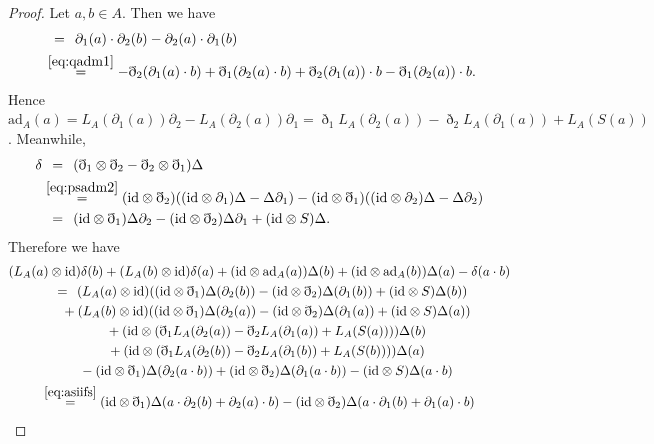 \documentclass[10pt,a4paper]{amsart}
\numberwithin{equation}{section}
\newcommand{\ad}{\mathrm{ad}}
\newcommand{\id}{\mathrm{id}}
\begin{document}
\begin{proof} Let $a, b \in A$. Then we have
 \begin{align*}
 [a,b] &\overset{\hphantom{(2.7)}}{=} \partial_1(a) \cdot \partial_2(b) - \partial_2(a) \cdot \partial_1(b) \\
 & \overset{\eqref{eq:qadm1}}{=} -\eth_2(\partial_1(a) \cdot b) + \eth_1(\partial_2(a) \cdot b) + \eth_2(\partial_1(a)) \cdot b - \eth_1(\partial_2(a)) \cdot b.
 \end{align*}
 Hence $\ad_A(a) = L_A(\partial_1(a))\partial_2 - L_A(\partial_2(a))\partial_1 = \eth_1 L_A(\partial_2(a)) - \eth_2 L_A(\partial_1(a)) + L_A(S(a))$. Meanwhile,
 \begin{align*}
 \delta &\overset{\hphantom{(3.6)}}{=} (\eth_1 \otimes \eth_2 - \eth_2 \otimes \eth_1)\Delta \\
 &\overset{\eqref{eq:psadm2}}{=}(\id \otimes \eth_2)( (\id \otimes \partial_1 )\Delta - \Delta \partial_1) - (\id \otimes \eth_1)( (\id \otimes \partial_2)\Delta - \Delta \partial_2) \\
 &\overset{\hphantom{(3.6)}}{=} (\id \otimes \eth_1)\Delta \partial_2 - (\id \otimes \eth_2)\Delta \partial_1 + (\id \otimes S)\Delta.
 \end{align*}
 Therefore we have
 \begin{gather*}
 (L_A(a) \otimes \id)\delta(b) + (L_A(b) \otimes \id)\delta(a) + (\id \otimes \ad_A(a))\Delta(b) +(\id \otimes \ad_A(b))\Delta(a) -\delta(a \cdot b) \\
 \overset{\hphantom{(3.2)}}{=} (L_A(a) \otimes \id)( (\id \otimes \eth_1)\Delta(\partial_2(b)) -(\id \otimes \eth_2)\Delta(\partial_1(b)) + (\id \otimes S)\Delta (b)) \\
 \quad {}+ (L_A(b) \otimes \id)( (\id \otimes \eth_1)\Delta(\partial_2(a))-(\id \otimes \eth_2)\Delta(\partial_1(a)) + (\id \otimes S)\Delta (a) ) \\
 \quad {}+ (\id \otimes (\eth_1 L_A(\partial_2(a)) -\eth_2 L_A(\partial_1(a)) + L_A(S(a)) ) )\Delta(b) \\
 \quad {}+ (\id \otimes (\eth_1 L_A(\partial_2(b)) -\eth_2 L_A(\partial_1(b)) + L_A(S(b)) ) )\Delta(a) \\
 \quad {}- (\id \otimes \eth_1)\Delta(\partial_2(a \cdot b)) + (\id \otimes \eth_2)\Delta(\partial_1(a \cdot b)) - (\id \otimes S)\Delta(a \cdot b) \\
 \overset{\eqref{eq:asiifs}}{=} (\id \otimes \eth_1) \Delta(a \cdot \partial_2(b) + \partial_2(a) \cdot b ) - (\id \otimes \eth_2) \Delta(a \cdot \partial_1(b)+ \partial_1(a) \cdot b) \\

\end{gather*}
\end{proof}
\end{document}

